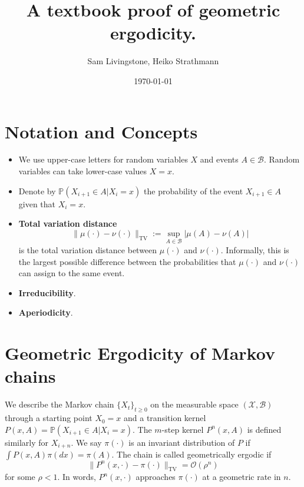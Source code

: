 \documentclass{article}
\title{\Large \bfseries A textbook proof of geometric ergodicity.}
\author{Sam Livingstone, Heiko Strathmann}
\date{\today}
\newcommand{\TV}{\text{TV}}
\begin{document}
\maketitle

\listoftodos

\section{Notation and Concepts}

\begin{itemize}
\item We use upper-case letters for random variables $X$ and events $A\in \mathcal{B}$. Random variables can take lower-case values $X=x$.
\item Denote by $\mathbb{P}(X_{i+1} \in A |X_i = x)$ the probability of the event $X_{i+1} \in A$ given that $X_i = x$.
\item \textbf{Total variation distance}
\begin{equation*}
\|\mu(\cdot) - \nu(\cdot)\|_{\TV} := \sup_{A \in \mathcal{B}} |\mu(A) - \nu(A)|
\end{equation*}
is the total variation distance between $\mu(\cdot)$ and $\nu(\cdot)$. Informally, this is the largest possible difference between the probabilities that $\mu(\cdot)$ and $\nu(\cdot)$ can assign to the same event.
\item \textbf{Irreducibility}. 
\item \textbf{Aperiodicity}. 


\end{itemize}

\section{Geometric Ergodicity of Markov chains}

We describe the Markov chain $\{ X_t \}_{t \geq 0}$ on the measurable space $(\mathcal{X},\mathcal{B})$ through a starting point $X_0 = x$ and a transition kernel $P(x,A) = \mathbb{P}(X_{i+1} \in A |X_i = x)$.  The $m$-step kernel $P^n(x,A)$ is defined similarly for $X_{i+n}$.  We say $\pi(\cdot)$ is an invariant distribution of $P$ if $\int P(x,A)\pi(dx) = \pi(A)$. The chain is called geometrically ergodic if
\begin{equation} \label{eqn:ge}
\| P^n(x,\cdot) - \pi(\cdot) \|_{\TV} = \mathcal{O}(\rho^n)
\end{equation}
for some $\rho < 1$.  In words, $P^n(x,\cdot)$ approaches $\pi(\cdot)$ at a geometric rate in $n$. 
\end{document}
